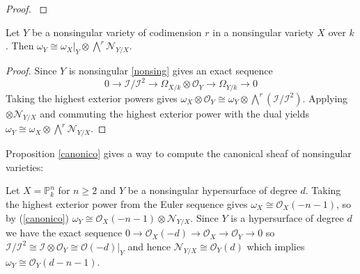 \documentclass[
	oldfontcommands,
	sumario=abnt-6027-2012,
	12pt,			%
	openright,		%
	oneside,		%
	a4paper,		%
	english,		%
	brazil			%
	]{imecc-unicamp}
\begin{document}
\begin{proof}
\cite[Hartshorne, theorem II.8.17]{hartshorne_2010}
\end{proof}
\begin{proposition}\label{canonico}
Let $Y$ be a nonsingular variety of codimension $r$ in a nonsingular variety $X$ over $k$. Then $\omega_Y \cong \omega_X|_Y \otimes \bigwedge^r \mathcal{N}_{Y/X}.$
\end{proposition}
\begin{proof}
Since $Y$ is nonsingular \ref{nonsing} gives an exact sequence
\begin{equation}
0 \to \mathcal{I}/\mathcal{I}^2 \to \Omega_{X/k} \otimes \mathcal{O}_Y \to \Omega_{Y/k} \to 0
\end{equation}
Taking the highest exterior powers gives $\omega_X \otimes \mathcal{O}_Y \cong \omega_Y \otimes \bigwedge^r(\mathcal{I}/\mathcal{I}^2)$. Applying $\otimes \mathcal{N}_{Y/X}$ and commuting the highest exterior power with the dual yields $\omega_Y \cong \omega_X \otimes \bigwedge^r \mathcal{N}_{Y/X}$.
\end{proof}
Proposition \ref{canonico} gives a way to compute the canonical sheaf of nonsingular varieties:
\begin{example}\label{canonicosurface}
Let $X=\mathbb{P}^n_k$ for $n \geq 2$ and $Y$ be a nonsingular hypersurface of degree $d$. Taking the highest exterior power from the Euler sequence gives $\omega_X \cong \mathcal{O}_X(-n-1)$, so by (\ref{canonico}) $\omega_Y \cong \mathcal{O}_X(-n-1) \otimes \mathcal{N}_{Y/X}$. Since $Y$ is a hypersurface of degree $d$ we have the exact sequence $0 \to \mathcal{O}_X(-d) \to \mathcal{O}_X \to \mathcal{O}_Y \to 0$ so $\mathcal{I}/\mathcal{I}^2 \cong \mathcal{I} \otimes \mathcal{O}_Y \cong \mathcal{O}(-d)|_Y$ and hence $\mathcal{N}_{Y/X} \cong \mathcal{O}_Y(d)$ which implies $\omega_Y \cong \mathcal{O}_Y(d-n-1)$.
\end{example}
\end{document}
